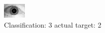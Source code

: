 \begin{figure}[h!]
\begin{center}
\includegraphics[width=0.60\columnwidth]{figures/ID1652_class_3_target_2.png}
\end{center}
\caption{ Classification: 3 actual target: 2}
\label{fig:ID1652_class_3_target_2}
\end{figure}
